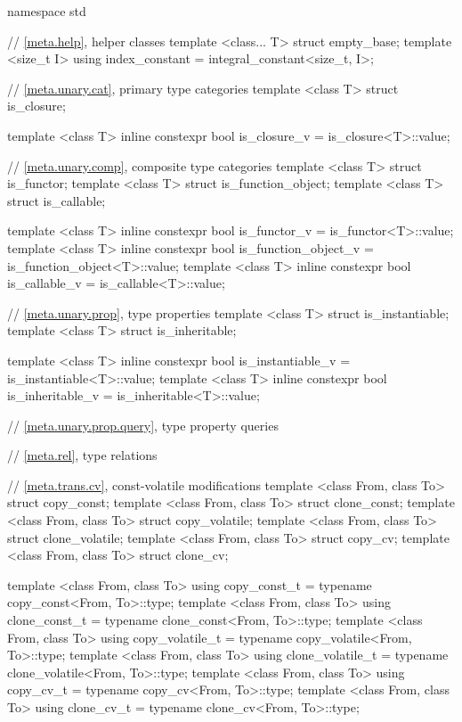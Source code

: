 \documentclass[ebook,10pt,oneside,openany,final]{memoir}
\begin{document}
%
%
\begin{codeblock}
namespace std {
    // \ref{meta.help}, helper classes
    template <class... T> struct empty_base;
    template <size_t I> using index_constant = integral_constant<size_t, I>;
    
    // \ref{meta.unary.cat}, primary type categories
    template <class T> struct is_closure;

    template <class T>
    inline constexpr bool is_closure_v = is_closure<T>::value;
    
    // \ref{meta.unary.comp}, composite type categories
    template <class T> struct is_functor;
    template <class T> struct is_function_object;
    template <class T> struct is_callable;

    template <class T>
    inline constexpr bool is_functor_v = is_functor<T>::value;
    template <class T>
    inline constexpr bool is_function_object_v = is_function_object<T>::value;
    template <class T>
    inline constexpr bool is_callable_v = is_callable<T>::value;
    
    // \ref{meta.unary.prop}, type properties
    template <class T> struct is_instantiable;
    template <class T> struct is_inheritable;

    template <class T>
    inline constexpr bool is_instantiable_v = is_instantiable<T>::value;
    template <class T>
    inline constexpr bool is_inheritable_v = is_inheritable<T>::value;
    
    // \ref{meta.unary.prop.query}, type property queries
    
    // \ref{meta.rel}, type relations
    
    // \ref{meta.trans.cv}, const-volatile modifications
    template <class From, class To> struct copy_const;
    template <class From, class To> struct clone_const;
    template <class From, class To> struct copy_volatile;
    template <class From, class To> struct clone_volatile;
    template <class From, class To> struct copy_cv;
    template <class From, class To> struct clone_cv;

    template <class From, class To>
    using copy_const_t = typename copy_const<From, To>::type;
    template <class From, class To>
    using clone_const_t = typename clone_const<From, To>::type;
    template <class From, class To>
    using copy_volatile_t = typename copy_volatile<From, To>::type;
    template <class From, class To>
    using clone_volatile_t = typename clone_volatile<From, To>::type;
    template <class From, class To>
    using copy_cv_t = typename copy_cv<From, To>::type;
    template <class From, class To>
    using clone_cv_t = typename clone_cv<From, To>::type;
    
}
\end{codeblock}
\end{document}
